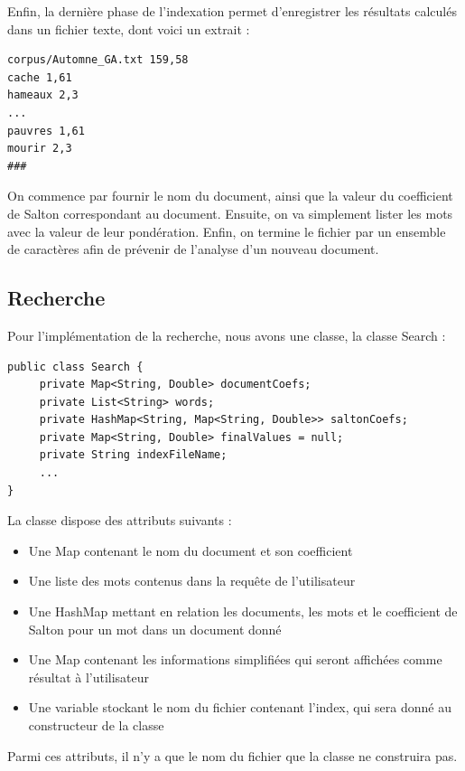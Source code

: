 \documentclass{article}
\begin{document}
Enfin, la dernière phase de l'indexation permet d'enregistrer les résultats calculés dans un
fichier texte, dont voici un extrait :

\begin{lstlisting}
corpus/Automne_GA.txt 159,58
cache 1,61
hameaux 2,3
...
pauvres 1,61
mourir 2,3
###
\end{lstlisting}

On commence par fournir le nom du document, ainsi que la valeur du coefficient de Salton
correspondant au document. Ensuite, on va simplement lister les mots avec la valeur de leur
pondération. Enfin, on termine le fichier par un ensemble de caractères afin de prévenir de
l'analyse d'un nouveau document.

\subsection{Recherche}

Pour l'implémentation de la recherche, nous avons une classe, la classe Search :

\begin{lstlisting}
public class Search {
     private Map<String, Double> documentCoefs;
     private List<String> words;
     private HashMap<String, Map<String, Double>> saltonCoefs;
     private Map<String, Double> finalValues = null;
     private String indexFileName;
     ...
}
\end{lstlisting}

La classe dispose des attributs suivants :
\begin{itemize}
  \item Une Map contenant le nom du document et son coefficient 
  \item Une liste des mots contenus dans la requête de l'utilisateur 
  \item Une HashMap mettant en relation les documents, les mots et le coefficient de Salton pour un mot dans un document donné
  \item Une Map contenant les informations simplifiées qui seront affichées comme résultat à l'utilisateur
  \item Une variable stockant le nom du fichier contenant l'index, qui sera donné au constructeur de la classe
\end{itemize}
Parmi ces attributs, il n'y a que le nom du fichier que la classe ne construira pas.\\
\end{document}
